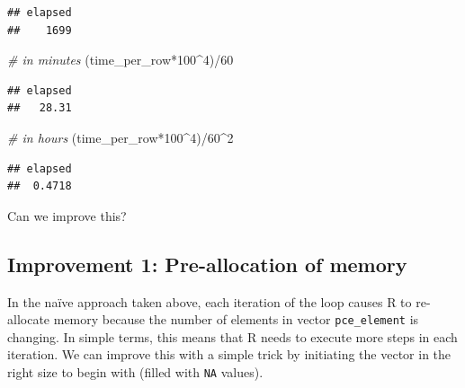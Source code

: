\documentclass[
  12pt,
]{style/krantz}
\newenvironment{Shaded}{\begin{snugshade}}{\end{snugshade}}
\newcommand{\CommentTok}[1]{\textcolor[rgb]{0.56,0.35,0.01}{\textit{#1}}}
\newcommand{\DecValTok}[1]{\textcolor[rgb]{0.00,0.00,0.81}{#1}}
\newcommand{\NormalTok}[1]{#1}
\newcommand{\SpecialCharTok}[1]{\textcolor[rgb]{0.00,0.00,0.00}{#1}}
\begin{document}
\begin{verbatim}
## elapsed 
##    1699
\end{verbatim}

\begin{Shaded}
\begin{Highlighting}[]
\CommentTok{\# in minutes}
\NormalTok{(time\_per\_row}\SpecialCharTok{*}\DecValTok{100}\SpecialCharTok{\^{}}\DecValTok{4}\NormalTok{)}\SpecialCharTok{/}\DecValTok{60} 
\end{Highlighting}
\end{Shaded}

\begin{verbatim}
## elapsed 
##   28.31
\end{verbatim}

\begin{Shaded}
\begin{Highlighting}[]
\CommentTok{\# in hours}
\NormalTok{(time\_per\_row}\SpecialCharTok{*}\DecValTok{100}\SpecialCharTok{\^{}}\DecValTok{4}\NormalTok{)}\SpecialCharTok{/}\DecValTok{60}\SpecialCharTok{\^{}}\DecValTok{2} 
\end{Highlighting}
\end{Shaded}

\begin{verbatim}
## elapsed 
##  0.4718
\end{verbatim}

Can we improve this?

\hypertarget{improvement-1-pre-allocation-of-memory}{%
\subsection{Improvement 1: Pre-allocation of memory}\label{improvement-1-pre-allocation-of-memory}}

In the naïve approach taken above, each iteration of the loop causes R to re-allocate memory because the number of elements in vector \texttt{pce\_element} is changing. In simple terms, this means that R needs to execute more steps in each iteration. We can improve this with a simple trick by initiating the vector in the right size to begin with (filled with \texttt{NA} values).
\end{document}

